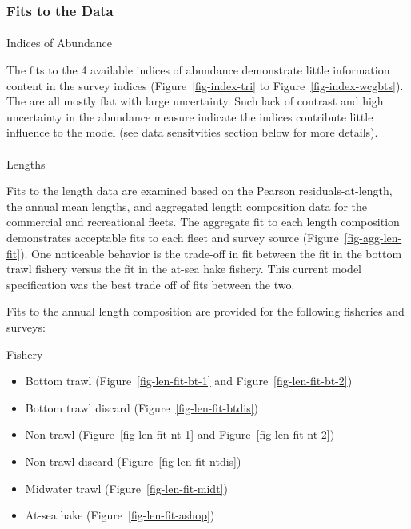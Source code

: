 \documentclass[
]{scrartcl}
\makeatletter
\let\oldparagraph\paragraph
\renewcommand{\paragraph}{
    \@ifstar
      \xxxParagraphStar
      \xxxParagraphNoStar
  }
\newcommand{\xxxParagraphStar}[1]{\oldparagraph*{#1}\mbox{}}
\newcommand{\xxxParagraphNoStar}[1]{\oldparagraph{#1}\mbox{}}
\providecommand{\tightlist}{%
  \setlength{\itemsep}{0pt}\setlength{\parskip}{0pt}}\usepackage{longtable,booktabs,array}
\makeatother
\begin{document}
\subsubsection{Fits to the Data}\label{fits-to-the-data}

\paragraph{Indices of Abundance}\label{indices-of-abundance}

The fits to the 4 available indices of abundance demonstrate little
information content in the survey indices (Figure~\ref{fig-index-tri} to
Figure~\ref{fig-index-wcgbts}). The are all mostly flat with large
uncertainty. Such lack of contrast and high uncertainty in the abundance
measure indicate the indices contribute little influence to the model
(see data sensitvities section below for more details).

\paragraph{Lengths}\label{lengths}

Fits to the length data are examined based on the Pearson
residuals-at-length, the annual mean lengths, and aggregated length
composition data for the commercial and recreational fleets. The
aggregate fit to each length composition demonstrates acceptable fits to
each fleet and survey source (Figure~\ref{fig-agg-len-fit}). One
noticeable behavior is the trade-off in fit between the fit in the
bottom trawl fishery versus the fit in the at-sea hake fishery. This
current model specification was the best trade off of fits between the
two.

Fits to the annual length composition are provided for the following
fisheries and surveys:

Fishery

\begin{itemize}
\tightlist
\item
  Bottom trawl (Figure~\ref{fig-len-fit-bt-1} and
  Figure~\ref{fig-len-fit-bt-2})
\item
  Bottom trawl discard (Figure~\ref{fig-len-fit-btdis})
\item
  Non-trawl (Figure~\ref{fig-len-fit-nt-1} and
  Figure~\ref{fig-len-fit-nt-2})
\item
  Non-trawl discard (Figure~\ref{fig-len-fit-ntdis})
\item
  Midwater trawl (Figure~\ref{fig-len-fit-midt})
\item
  At-sea hake (Figure~\ref{fig-len-fit-ashop})
\end{itemize}
\end{document}
